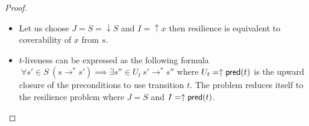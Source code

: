 \begin{proof}

\begin{itemize}
\item Let us choose $J=S= \downarrow S$ and $I=\uparrow x$ then resilience is equivalent to coverability of $x$ from $s$.

\item $t$-liveness  can be expressed as the following formula
$ ~ \forall s' \in S ~ (s \rightarrow^* s') \implies \exists s'' \in U_t ~ s' \rightarrow^{*} s''$ 
where
$U_t=\uparrow \textsf{pred}(t)$
is the upward closure of the preconditions to use transition $t$.  
The problem reduces itself to the resilience problem
where $J=S$ and $I = \uparrow \textsf{pred}(t)$.

\end{itemize}

\end{proof}









